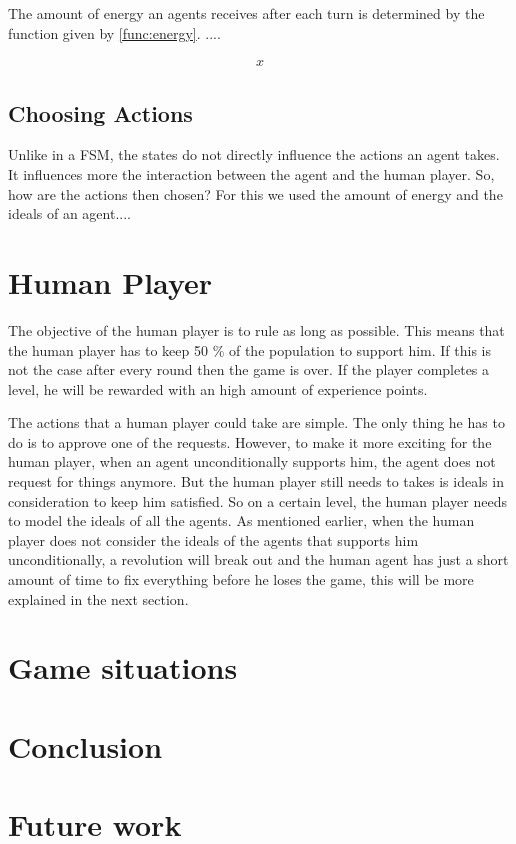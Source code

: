 \documentclass[11pt,a4paper]{article}
\begin{document}
The amount of energy an agents receives after each turn is determined by the function given by \ref{func:energy}. ....

\begin{align}
\label{func:energy}
x
\end{align}

\subsection{Choosing Actions}
Unlike in a FSM, the states do not directly influence the actions an agent takes. It influences more the interaction between the agent and the human player. So, how are the actions then chosen? For this we used the amount of energy and the ideals of an agent....

\section{Human Player}
\label{sec:hp}
The objective of the human player is to rule as long as possible. This means that the human player has to keep 50 \% of the population to support him. If this is not the case after every round then the game is over. If the player completes a level, he will be rewarded with an high amount of experience points. 

The actions that a human player could take are simple. The only thing he has to do is to approve one of the requests. However, to make it more exciting for the human player, when an agent unconditionally supports him, the agent does not request for things anymore. But the human player still needs to takes is ideals in consideration to keep him satisfied. So on a certain level, the human player needs to model the ideals of all the agents. As mentioned earlier, when the human player does not consider the ideals of the agents that supports him unconditionally, a revolution will break out and the human agent has just a short amount of time to fix everything before he loses the game, this will be more explained in the next section. 

\section{Game situations}
\label{sec:gs}


\section{Conclusion}
\label{sec:co}


\section{Future work}
\label{sec:fw}
\end{document}
